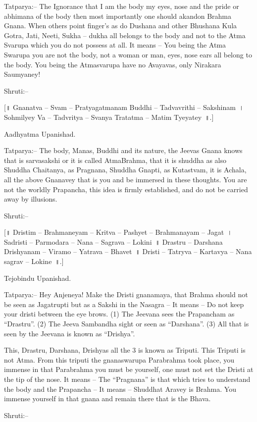 Tatparya:– The Ignorance that I am the body my eyes, nose and the pride or abhimana of the body then most importantly one should akandon Brahma Gnana. When others point finger's as do Dushana and other Bhushana Kula Gotra, Jati, Neeti, Sukha – dukha all belongs to the body and not to the Atma Svarupa which you do not possess at all. It means – You being the Atma Swarupa you are not the body, not a woman or man, eyes, nose ears all belong to the body. You being the Atmasvarupa have no Avayavas, only Nirakara Saumyaney!

Shruti:–

[॥ Gnanatva – Svam – Pratyagatmanam Buddhi – Tadvavrithi – Sakshinam~। Sohmilyey Va – Tadvritya – Svanya Tratatma – Matim Tyeyatey~॥.]

Aadhyatma Upanishad.

Tatparya:– The body, Manas, Buddhi and its nature, the Jeevas Gnana knows that is sarvasakshi or it is called AtmaBrahma, that it is shuddha as also Shuddha Chaitanya, as Pragnana, Shuddha Gnapti, as Kutastvam, it is Achala, all the above Gnanavey that is you and be immersed in these thoughts. You are not the worldly Prapancha, this idea is firmly established, and do not be carried away by illusions.

Shruti:–

[॥ Dristim – Brahmaneyam – Kritva – Pashyet – Brahmanayam – Jagat~। Sadristi – Parmodara – Nana – Sagrava – Lokini~॥ Drastru – Darshana Drishyanam – Viramo – Yatrava – Bhavet~॥ Dristi – Tatryva – Kartavya – Nana sagrav – Lokine~॥.]

Tejobindu Upanishad.

Tatparya:– Hey Anjeneya! Make the Dristi gnanamaya, that Brahma should not be seen as Jagatrupti but as a Sakshi in the Nasagra – It means – Do not keep your dristi between the eye brows. (1) The Jeevana sees the Prapancham as “Drastru”. (2) The Jeeva Sambandha sight or seen as “Darshana”. (3) All that is seen by the Jeevana is known as “Drishya”.

This, Drastru, Darshana, Drishyas all the 3 is known as Triputi. This Triputi is not Atma. From this triputi the gnanaswarupa Parabrahma took place, you immense in that Parabrahma you must be yourself, one must not set the Dristi at the tip of the nose. It means – The “Pragnana” is that which tries to understand the body and the Prapancha – It means – Shuddhat Aravey is Brahma. You immense yourself in that gnana and remain there that is the Bhava.

Shruti:–


